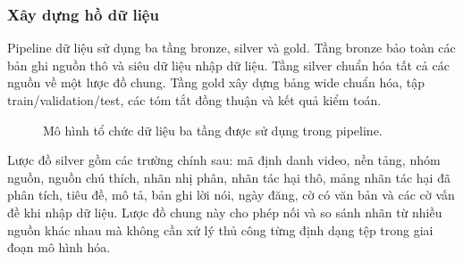 \subsubsection{Xây dựng hồ dữ liệu}

Pipeline dữ liệu sử dụng ba tầng bronze, silver và gold. Tầng bronze bảo toàn các bản ghi nguồn thô và siêu dữ liệu nhập dữ liệu. Tầng silver chuẩn hóa tất cả các nguồn về một lược đồ chung. Tầng gold xây dựng bảng wide chuẩn hóa, tập train/validation/test, các tóm tắt đồng thuận và kết quả kiểm toán.

\begin{figure}[H]
\centering
{}
\caption{Mô hình tổ chức dữ liệu ba tầng được sử dụng trong pipeline.}
\label{fig:implementation-data-layers}
\end{figure}

Lược đồ silver gồm các trường chính sau: mã định danh video, nền tảng, nhóm nguồn, nguồn chú thích, nhãn nhị phân, nhãn tác hại thô, mảng nhãn tác hại đã phân tích, tiêu đề, mô tả, bản ghi lời nói, ngày đăng, cờ có văn bản và các cờ vấn đề khi nhập dữ liệu. Lược đồ chung này cho phép nối và so sánh nhãn từ nhiều nguồn khác nhau mà không cần xử lý thủ công từng định dạng tệp trong giai đoạn mô hình hóa.


